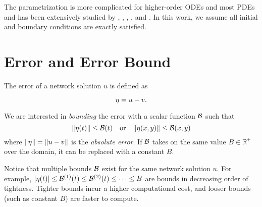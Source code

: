     The parametrization is more complicated for higher-order ODEs and most PDEs and has been extensively studied by \citeauthor{lagaris1998artificial}\cite{lagaris1998artificial}, \citeauthor{lagaris2000neural}\cite{lagaris2000neural}, \citeauthor{mcfall2009artificial}\cite{mcfall2009artificial}, \citeauthor{lagari2020systematic}\cite{lagari2020systematic}, and \citeauthor{sukumar2021exact}\cite{sukumar2021exact}.
    In this work, we assume all initial and boundary conditions are exactly satisfied.

\section{Error and Error Bound}
    The error of a network solution $u$ is defined as 
    {
        \begin{equation}
            \eta = u - v.
        \end{equation}

    }
    We are interested in \textit{bounding} the error with a scalar function $\mathcal{B}$ such that 
    {
        \begin{equation}
            \|\eta(t)\| \leq \mathcal{B}(t) \quad \text{or} \quad \|\eta(x, y)\| \leq \mathcal{B}(x, y)
        \end{equation}
    }
    where $\|\eta\| = \|u - v\|$ is the \textit{absolute error}.
    If $\mathcal{B}$ takes on the same value $B \in \mathbb{R}^{+}$ over the domain, it can be replaced with a constant $B$.

    Notice that multiple bounds $\mathcal{B}$ exist for the same network solution $u$.
    For example, $|\eta(t)| \leq \mathcal{B}^{(1)}(t) \leq  \mathcal{B}^{(2)}(t) \leq \dots \leq B$ are bounds in decreasing order of tightness. Tighter bounds incur a higher computational cost, and looser bounds (such as constant $B$) are faster to compute.